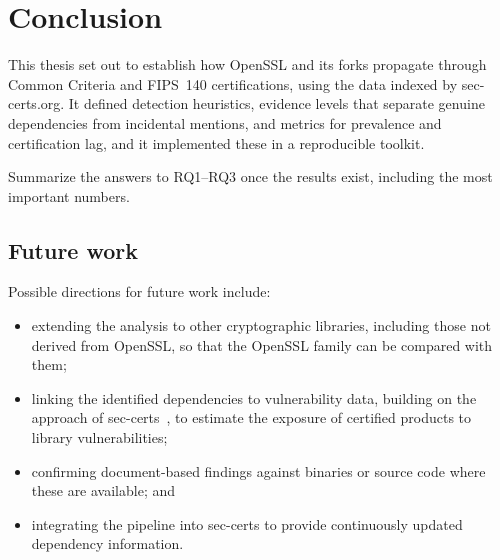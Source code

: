 \chapter*{Conclusion}

This thesis set out to establish how OpenSSL and its forks propagate through
Common Criteria and FIPS~140 certifications, using the data indexed by sec-certs.org.
It defined detection heuristics, evidence levels that separate genuine dependencies
from incidental mentions, and metrics for prevalence and certification lag, and it
implemented these in a reproducible toolkit.

{Summarize the answers to RQ1--RQ3 once the results exist, including the most
important numbers.}

\section*{Future work}

Possible directions for future work include:

\begin{itemize}
  \item extending the analysis to other cryptographic libraries, including those not
    derived from OpenSSL, so that the OpenSSL family can be compared with them;
  \item linking the identified dependencies to vulnerability data, building on the
    approach of sec-certs~\cite{janovsky2024seccerts}, to estimate the exposure of
    certified products to library vulnerabilities;
  \item confirming document-based findings against binaries or source code where
    these are available; and
  \item integrating the pipeline into sec-certs to provide continuously updated
    dependency information.
\end{itemize}
